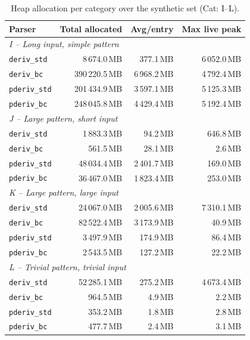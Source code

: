 \begin{table}[H]
\centering
\small
\setlength{\tabcolsep}{3pt}
\renewcommand{\arraystretch}{1.1}
\begin{tabular*}{\textwidth}{@{\extracolsep{\fill}} l rrr}
\hline
Parser & Total allocated & Avg/entry & Max live peak \\
\hline
\multicolumn{4}{l}{\textit{I -- Long input, simple pattern}} \\
\texttt{deriv\_std}  &  8\,674.0\,MB &   377.1\,MB & 6\,052.0\,MB \\
\texttt{deriv\_bc}   & 390\,220.5\,MB & 6\,968.2\,MB & 4\,792.4\,MB \\
\texttt{pderiv\_std} & 201\,434.9\,MB & 3\,597.1\,MB & 5\,125.3\,MB \\
\texttt{pderiv\_bc}  & 248\,045.8\,MB & 4\,429.4\,MB & 5\,192.4\,MB \\
\hline
\multicolumn{4}{l}{\textit{J -- Large pattern, short input}} \\
\texttt{deriv\_std}  &  1\,883.3\,MB &    94.2\,MB &   646.8\,MB \\
\texttt{deriv\_bc}   &    561.5\,MB &    28.1\,MB &     2.6\,MB \\
\texttt{pderiv\_std} & 48\,034.4\,MB & 2\,401.7\,MB &   169.0\,MB \\
\texttt{pderiv\_bc}  & 36\,467.0\,MB & 1\,823.4\,MB &   253.0\,MB \\
\hline
\multicolumn{4}{l}{\textit{K -- Large pattern, large input}} \\
\texttt{deriv\_std}  & 24\,067.0\,MB & 2\,005.6\,MB & 7\,310.1\,MB \\
\texttt{deriv\_bc}   & 82\,522.4\,MB & 3\,173.9\,MB &    40.9\,MB \\
\texttt{pderiv\_std} &  3\,497.9\,MB &   174.9\,MB &    86.4\,MB \\
\texttt{pderiv\_bc}  &  2\,543.5\,MB &   127.2\,MB &    22.2\,MB \\
\hline
\multicolumn{4}{l}{\textit{L -- Trivial pattern, trivial input}} \\
\texttt{deriv\_std}  & 52\,285.1\,MB &   275.2\,MB & 4\,673.4\,MB \\
\texttt{deriv\_bc}   &    964.5\,MB &     4.9\,MB &     2.2\,MB \\
\texttt{pderiv\_std} &    353.2\,MB &     1.8\,MB &     2.8\,MB \\
\texttt{pderiv\_bc}  &    477.7\,MB &     2.4\,MB &     3.1\,MB \\
\hline
\end{tabular*}
\caption{Heap allocation per category over the synthetic set
(Cat: I--L).}
\label{tab:patho-memory-full-hl}
\end{table}

